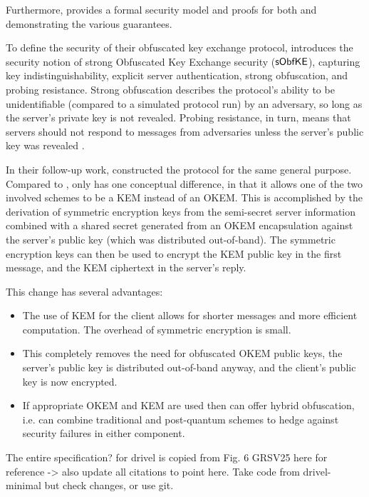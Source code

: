 Furthermore, \cite{CCS:GunSteVei24} provides a formal security model and proofs for both \obfsfour{} and \pqobfs{} demonstrating the various guarantees.

To define the security of their obfuscated key exchange protocol, \cite{CCS:GunSteVei24} introduces the security notion of strong Obfuscated Key Exchange security ($\mathsf{sObfKE}$), capturing key indistinguishability, explicit server authentication, strong obfuscation, and probing resistance. Strong obfuscation describes the protocol's ability to be unidentifiable (compared to a simulated protocol run) by an adversary, so long as the server's private key is not revealed. Probing resistance, in turn, means that servers should not respond to messages from adversaries unless the server's public key was revealed \cite[Section~4.1]{CCS:GunSteVei24}.

In their follow-up work, \cite{EPRINT:GRSV25} constructed the \drivel{} protocol for the same general purpose. Compared to \pqobfs{}, \drivel{} only has one conceptual difference, in that it allows one of the two involved schemes to be a KEM instead of an OKEM.
This is accomplished by the derivation of symmetric encryption keys from the semi-secret server information combined with a shared secret generated from an OKEM encapsulation against the server's public key (which was distributed out-of-band).
The symmetric encryption keys can then be used to encrypt the KEM public key in the first message, and the KEM ciphertext in the server's reply.

This change has several advantages:
\begin{itemize}
    \item The use of KEM for the client allows for shorter messages and more efficient computation. The overhead of symmetric encryption is small.
    \item This completely removes the need for obfuscated OKEM public keys, the server's public key is distributed out-of-band anyway, and the client's public key is now encrypted.
    \item If appropriate OKEM and KEM are used then \drivel{} can offer hybrid obfuscation, i.e. \drivel{} can combine traditional and post-quantum schemes to hedge against security failures in either component.
\end{itemize}

The entire specification? for drivel is copied from Fig. 6 GRSV25 here for reference -> also update all citations to point here. Take code from drivel-minimal but check changes, or use git.

